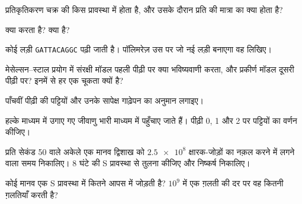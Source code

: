 \begin{exercise}[$\star$]\label{exo:g11:dna-replication:3}
प्रतिकृतिकरण  चक्र की किस प्रावस्था में होता है, और उसके दौरान
प्रति   की मात्रा का क्या होता है?
\end{exercise}

\begin{exercise}[$\star$]\label{exo:g11:dna-replication:4}
 क्या करता है?  क्या है?
\end{exercise}

\begin{exercise}[$\star$]\label{exo:g11:dna-replication:5}
कोई लड़ी \texttt{GATTACAGGC} पढ़ी जाती है। पॉलिमरेज़ उस पर जो नई लड़ी
बनाएगा वह लिखिए।
\end{exercise}

\begin{exercise}[$\star\star$]\label{exo:g11:dna-replication:6}
मेसेल्सन--स्टाल प्रयोग में संरक्षी मॉडल पहली पीढ़ी पर क्या भविष्यवाणी
करता, और प्रकीर्ण मॉडल दूसरी पीढ़ी पर? इनमें से हर एक चूकता क्यों है?
\end{exercise}

\begin{exercise}[$\star\star$]\label{exo:g11:dna-replication:7}
पाँचवीं पीढ़ी की पट्टियों और उनके सापेक्ष गाढ़ेपन का अनुमान लगाइए।
\end{exercise}

\begin{exercise}[$\star\star$]\label{exo:g11:dna-replication:8}
हल्के माध्यम में उगाए गए जीवाणु भारी माध्यम में पहुँचाए जाते हैं। पीढ़ी
0, 1 और 2 पर पट्टियों का वर्णन कीजिए।
\end{exercise}

\begin{exercise}[$\star\star$]\label{exo:g11:dna-replication:9}
प्रति सेकंड 50  वाले अकेले एक मानव द्विशाख को
$\num{2.5e8}$ क्षारक-जोड़ों का  नक़ल करने में लगने वाला समय
निकालिए। 8 घंटे की S प्रावस्था से तुलना कीजिए और निष्कर्ष निकालिए।
\end{exercise}

\begin{exercise}[$\star\star$]\label{exo:g11:dna-replication:10}
कोई मानव  एक S प्रावस्था में कितने  आपस में जोड़ती
है? $10^9$ में एक ग़लती की दर पर वह कितनी ग़लतियाँ करती है?
\end{exercise}

